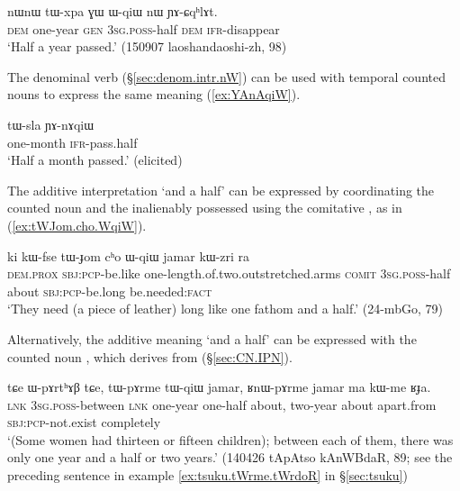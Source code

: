 \begin{exe}
\ex \label{ex:tWxpa.WqiW}
\gll nɯnɯ tɯ-xpa ɣɯ ɯ-qiɯ nɯ ɲɤ-ɕqʰlɤt. \\
\textsc{dem} one-year \textsc{gen} \textsc{3sg}.\textsc{poss}-half \textsc{dem} \textsc{ifr}-disappear \\
\glt  `Half a year passed.' (150907 laoshandaoshi-zh, 98)
\end{exe}

The denominal verb  (§\ref{sec:denom.intr.nW}) can be used with temporal counted nouns to express the same meaning (\ref{ex:YAnAqiW}).

\begin{exe}
	\ex \label{ex:YAnAqiW}
	\gll tɯ-sla ɲɤ-nɤqiɯ \\
	one-month \textsc{ifr}-pass.half \\
	\glt `Half a month passed.' (elicited)
\end{exe}

The additive interpretation  `and a half' can be expressed by coordinating the counted noun and the inalienably possessed  using the comitative , as in (\ref{ex:tWJom.cho.WqiW}).

\begin{exe}
\ex \label{ex:tWJom.cho.WqiW}
\gll ki kɯ-fse tɯ-ɟom cʰo ɯ-qiɯ jamar kɯ-zri ra \\
 \textsc{dem}.\textsc{prox} \textsc{sbj}:\textsc{pcp}-be.like one-length.of.two.outstretched.arms \textsc{comit} \textsc{3sg}.\textsc{poss}-half about \textsc{sbj}:\textsc{pcp}-be.long be.needed:\textsc{fact} \\
\glt `They need (a piece of leather) long like one fathom and a half.' (24-mbGo, 79)
\end{exe}

Alternatively, the additive meaning `and a half' can be expressed with the counted noun , which derives from   (§\ref{sec:CN.IPN}). 

\begin{exe}
\ex \label{ex:tWqiW}
\gll tɕe ɯ-pɤrtʰɤβ tɕe, tɯ-pɤrme tɯ-qiɯ jamar, ʁnɯ-pɤrme jamar ma kɯ-me ʁɟa. \\
 \textsc{lnk} \textsc{3sg}.\textsc{poss}-between \textsc{lnk} one-year one-half about, two-year about apart.from \textsc{sbj}:\textsc{pcp}-not.exist completely  \\
\glt  `(Some women had thirteen or fifteen children); between each of them, there was only one year and a half or two years.' (140426 tApAtso kAnWBdaR, 89; see the preceding sentence in example \ref{ex:tsuku.tWrme.tWrdoR} in §\ref{sec:tsuku})
\end{exe}

